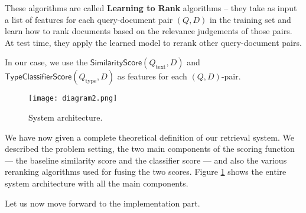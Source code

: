 These algorithms are called \textbf{Learning to Rank} algorithms --
they take as input a list of features for each query-document pair $(Q,D)$ in the training set
and learn how to rank documents based on the
relevance judgements of those pairs. At test time, they apply the learned model to rerank other query-document pairs.

In our case, we use the $\textsf{SimilarityScore}(Q_{\text{text}},D)$ and $\textsf{TypeClassifierScore}(Q_{\text{type}}, D)$ 
as features for each $(Q,D)$-pair.
\begin{figure}[h!]
\centerline{
  \texttt{[image: diagram2.png]}
  }
  \caption{System architecture.}
  \label{diagram2}
\end{figure}

We have now given a complete theoretical definition of our retrieval system. We described the problem setting,
the two main components of the scoring function --- the baseline similarity score and the classifier score ---
and also the various reranking algorithms used for fusing the two scores.
Figure \ref{diagram2} shows the entire system architecture with all the main components.

Let us now move forward to the implementation part.


